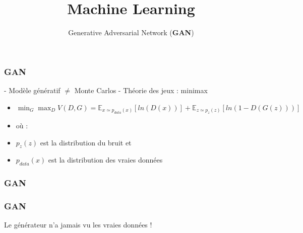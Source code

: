 \documentclass{formation}
\title{Machine Learning}
\subtitle{Generative Adversarial Network (\textbf{GAN})}
\begin{document}
\maketitle

\begin{frame}
  \frametitle{GAN}
  - Modèle génératif $\neq$ Monte Carlos
  \newline
  - Théorie des jeux : minimax
  \begin{itemize}
  \item $\min_G\max_DV(D,G) = \mathbb{E}_{x\simeq p_{data}(x)}[ln(D(x))] + \mathbb{E}_{z\simeq p_{z}(z)}[ln(1 - D(G(z)))]$
  \item où :
  \item $p_{z}(z)$ est la distribution du bruit et
  \item $p_{data}(x)$ est la distribution des vraies données
  \end{itemize}
\end{frame}

\begin{frame}
  \frametitle{GAN}
  \href{https://reiinakano.github.io/gan-playground/}{}
\end{frame}

\begin{frame}
  \frametitle{GAN}
  Le générateur n'a jamais vu les vraies données !
\end{frame}
\end{document}
